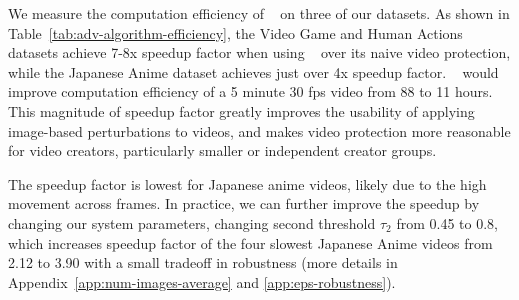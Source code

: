 We measure the computation efficiency of \system~ on three of our
datasets. As shown in Table~\ref{tab:adv-algorithm-efficiency}, the Video
Game and Human Actions datasets achieve 7-8x speedup factor when using \system~ over
its naive video protection, while the Japanese Anime dataset achieves just over
4x speedup factor. \system~ would improve computation efficiency of a 5 minute 30
fps video from 88 to 11 hours. This magnitude of speedup factor greatly improves the
usability of applying image-based perturbations to videos, and makes video
protection more reasonable for video creators, particularly smaller or
independent creator groups.

The speedup factor is lowest for Japanese anime videos, likely due to the high movement 
across frames. In practice, we can further improve the speedup by changing our
system parameters, \eg changing second threshold $\tau_2$
from 0.45 to 0.8, which increases speedup factor of the four slowest Japanese Anime videos from 2.12 to 3.90 with a small tradeoff in robustness (more details
in Appendix~\ref{app:num-images-average} and \ref{app:eps-robustness}).  

\begin{table}[t]
    \centering
    \caption{\system~ with Glaze enables significant computation speedup factor
      across all Video Game, Japanese Anime, and Human action videos when
      compared to naive video protection. For comparison, naive video
      protection takes on average 35 seconds per frame on a single A100 GPU.}
    \label{tab:adv-algorithm-efficiency}
\end{table}


\begin{table}[t]
    \centering
    \caption{Our user study shows that the percentage of users who notice
      perturbations generated by \system~ is
      significantly less than those who notice perturbations in naive video
      protection. (Tests implemented using Glaze).} 
    \label{tab:adv-algorithm-style-mimicry-visual}
\end{table}

